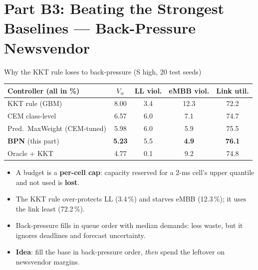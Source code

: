 \documentclass[aspectratio=169,11pt,xcolor=table]{beamer}
\newcommand{\best}[1]{\textbf{\textcolor{good}{#1}}}
\begin{document}
\section{Part B3: Beating the Strongest Baselines --- Back-Pressure Newsvendor}

\begin{frame}{Why the KKT rule loses to back-pressure (S high, 20 test seeds)}
  \centering
  \small
  \begin{tabular}{lcccc}
    \toprule
    Controller (all in \%) & $V_w$ & LL viol. & eMBB viol. & Link util. \\
    \midrule
    KKT rule (GBM) & 8.00 & 3.4 & 12.3 & 72.2 \\
    CEM class-level & 6.57 & 6.0 & 7.1 & 74.7 \\
    Pred.\ MaxWeight (CEM-tuned) & 5.98 & 6.0 & 5.9 & 75.5 \\
    \rowcolor{good!10} \textbf{BPN} (this part) & \best{5.23} & 5.5 & \best{4.9} & \best{76.1} \\
    Oracle + KKT & 4.77 & 0.1 & 9.2 & 74.8 \\
    \bottomrule
  \end{tabular}
  \raggedright
  \begin{itemize}\footnotesize
    \item A budget is a \textbf{per-cell cap}: capacity reserved for a 2-ms cell's upper quantile and not used is \textbf{lost}.
    \item The KKT rule over-protects LL (3.4\,\%) and starves eMBB (12.3\,\%); it uses the link least (72.2\,\%).
    \item Back-pressure fills in queue order with median demands: less waste, but it ignores deadlines and forecast uncertainty.
    \item \textbf{Idea}: fill the base in back-pressure order, \emph{then} spend the leftover on newsvendor margins.
  \end{itemize}
\end{frame}
\end{document}
